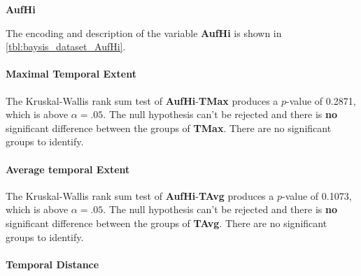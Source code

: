 \Large
\centerline{\textbf{AufHi}}
\normalsize
The encoding and description of the variable \textbf{AufHi} is shown in \autoref{tbl:baysis_dataset_AufHi}.

\paragraph{Maximal Temporal Extent}
The Kruskal-Wallis rank sum test of \textbf{AufHi}-\textbf{TMax} produces a $p$-value of 0.2871, which is above $\alpha=.05$. The null hypothesis can't be rejected and there is \textbf{no} significant difference between the groups of \textbf{TMax}. There are no significant groups to identify.

\paragraph{Average temporal Extent}
The Kruskal-Wallis rank sum test of \textbf{AufHi}-\textbf{TAvg} produces a $p$-value of 0.1073, which is above $\alpha=.05$. The null hypothesis can't be rejected and there is \textbf{no} significant difference between the groups of \textbf{TAvg}. There are no significant groups to identify.

\paragraph{Temporal Distance}

